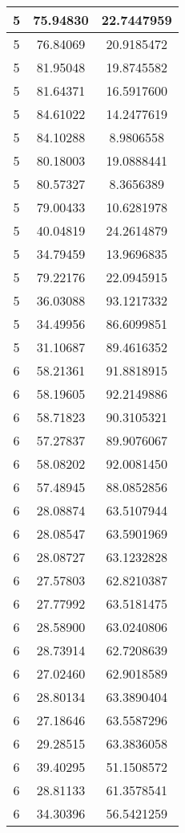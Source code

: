 \documentclass[
]{book}
\begin{document}
\begin{tabular}{c|c|c}
\hline
5 & 75.94830 & 22.7447959\\
\hline
5 & 76.84069 & 20.9185472\\
\hline
5 & 81.95048 & 19.8745582\\
\hline
5 & 81.64371 & 16.5917600\\
\hline
5 & 84.61022 & 14.2477619\\
\hline
5 & 84.10288 & 8.9806558\\
\hline
5 & 80.18003 & 19.0888441\\
\hline
5 & 80.57327 & 8.3656389\\
\hline
5 & 79.00433 & 10.6281978\\
\hline
5 & 40.04819 & 24.2614879\\
\hline
5 & 34.79459 & 13.9696835\\
\hline
5 & 79.22176 & 22.0945915\\
\hline
5 & 36.03088 & 93.1217332\\
\hline
5 & 34.49956 & 86.6099851\\
\hline
5 & 31.10687 & 89.4616352\\
\hline
6 & 58.21361 & 91.8818915\\
\hline
6 & 58.19605 & 92.2149886\\
\hline
6 & 58.71823 & 90.3105321\\
\hline
6 & 57.27837 & 89.9076067\\
\hline
6 & 58.08202 & 92.0081450\\
\hline
6 & 57.48945 & 88.0852856\\
\hline
6 & 28.08874 & 63.5107944\\
\hline
6 & 28.08547 & 63.5901969\\
\hline
6 & 28.08727 & 63.1232828\\
\hline
6 & 27.57803 & 62.8210387\\
\hline
6 & 27.77992 & 63.5181475\\
\hline
6 & 28.58900 & 63.0240806\\
\hline
6 & 28.73914 & 62.7208639\\
\hline
6 & 27.02460 & 62.9018589\\
\hline
6 & 28.80134 & 63.3890404\\
\hline
6 & 27.18646 & 63.5587296\\
\hline
6 & 29.28515 & 63.3836058\\
\hline
6 & 39.40295 & 51.1508572\\
\hline
6 & 28.81133 & 61.3578541\\
\hline
6 & 34.30396 & 56.5421259\\

\end{tabular}
\end{document}
